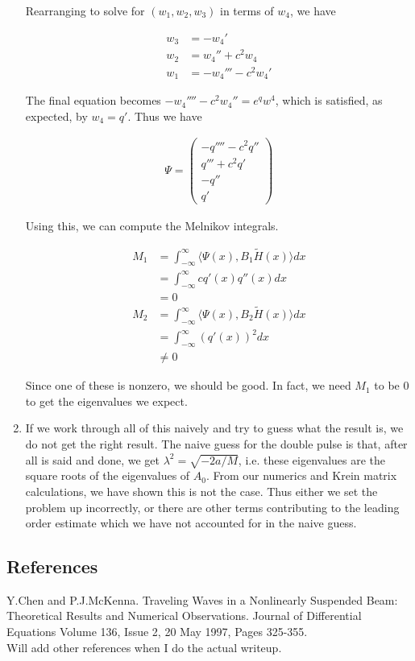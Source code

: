 \documentclass[12pt]{article}
\begin{document}
\begin{enumerate}
Rearranging to solve for $(w_1, w_2, w_3)$ in terms of $w_4$, we have

\begin{align*}
w_3 &= -w_4' \\
w_2 &= w_4'' + c^2 w_4 \\
w_1 &= -w_4''' - c^2 w_4'
\end{align*}

The final equation becomes $-w_4'''' - c^2 w_4'' = e^q w^4$, which is satisfied, as expected, by $w_4 = q'$. Thus we have

\begin{align*}
\Psi = \begin{pmatrix}
-q'''' - c^2 q''\\
q''' + c^2 q'\\
-q''\\
q'
\end{pmatrix}
\end{align*}

Using this, we can compute the Melnikov integrals.

\begin{align*}
M_1 &= \int_{-\infty}^\infty \langle \Psi(x), B_1 \tilde{H}(x) \rangle dx \\
&= \int_{-\infty}^\infty c q'(x) q''(x) dx \\
&= 0 \\
M_2 &= \int_{-\infty}^\infty \langle \Psi(x), B_2 \tilde{H}(x) \rangle dx \\
&= \int_{-\infty}^\infty  (q'(x))^2 dx \\
&\neq 0
\end{align*}

Since one of these is nonzero, we should be good. In fact, we need $M_1$ to be 0 to get the eigenvalues we expect.

\item If we work through all of this naively and try to guess what the result is, we do not get the right result. The naive guess for the double pulse is that, after all is said and done, we get $\lambda^2 = \sqrt{-2a / M}$, i.e. these eigenvalues are the square roots of the eigenvalues of $A_0$. From our numerics and Krein matrix calculations, we have shown this is not the case. Thus either we set the problem up incorrectly, or there are other terms contributing to the leading order estimate which we have not accounted for in the naive guess.


\end{enumerate}

\subsection{References}

Y.Chen and P.J.McKenna. Traveling Waves in a Nonlinearly Suspended Beam: Theoretical Results and Numerical Observations. Journal of Differential Equations Volume 136, Issue 2, 20 May 1997, Pages 325-355.\\

Will add other references when I do the actual writeup.
\end{document}
